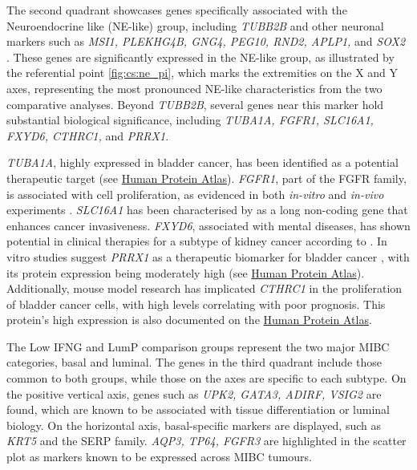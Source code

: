 The second quadrant showcases genes specifically associated with the Neuroendocrine like (NE-like) group, including \textit{TUBB2B} and other neuronal markers such as \textit{MSI1, PLEKHG4B, GNG4, PEG10, RND2, APLP1,} and \textit{SOX2} \citep{Robertson2017-mg}. These genes are significantly expressed in the NE-like group, as illustrated by the referential point \cref{fig:cs:ne_pi}, which marks the extremities on the X and Y axes, representing the most pronounced NE-like characteristics from the two comparative analyses. Beyond \textit{TUBB2B}, several genes near this marker hold substantial biological significance, including \textit{TUBA1A, FGFR1, SLC16A1, FXYD6, CTHRC1,} and \textit{PRRX1}.

\textit{TUBA1A}, highly expressed in bladder cancer, has been identified as a potential therapeutic target \citet{Zhang2019-fk} (see \href{https://www.proteinatlas.org/ENSG00000167552-TUBA1A/tissue}{Human Protein Atlas}). \textit{FGFR1}, part of the FGFR family, is associated with cell proliferation, as evidenced in both \textit{in-vitro} and \textit{in-vivo} experiments \citet{Tomlinson2009-td}. \textit{SLC16A1} has been characterised by \citet{Logotheti2020-ya} as a long non-coding gene that enhances cancer invasiveness. \textit{FXYD6}, associated with mental diseases, has shown potential in clinical therapies for a subtype of kidney cancer according to \citet{Gao2014-sq}. In vitro studies suggest \textit{PRRX1} as a therapeutic biomarker for bladder cancer \citet{Huang2022-ez}, with its protein expression being moderately high (see \href{https://www.proteinatlas.org/ENSG00000116132-PRRX1/tissue}{Human Protein Atlas}). Additionally, mouse model research has implicated \textit{CTHRC1} in the proliferation of bladder cancer cells, with high levels correlating with poor prognosis. This protein's high expression is also documented on the \href{https://www.proteinatlas.org/ENSG00000164932-CTHRC1/tissue}{Human Protein Atlas}.

The Low IFNG and LumP comparison groups represent the two major MIBC categories, basal and luminal. The genes in the third quadrant include those common to both groups, while those on the axes are specific to each subtype. On the positive vertical axis, genes such as \textit{UPK2, GATA3, ADIRF, VSIG2} are found, which are known to be associated with tissue differentiation or luminal biology. On the horizontal axis, basal-specific markers are displayed, such as \textit{KRT5} and the SERP family. \textit{AQP3, TP64, FGFR3} are highlighted in the scatter plot as markers known to be expressed across MIBC tumours.

